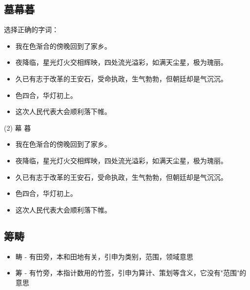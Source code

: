   \subsection{墓幕暮}

\begin{question}
选择正确的字词：

\begin{itemize}
  \item 我在\blank[width=0.5cm]{}色渐合的傍晚回到了家乡。
  \item 夜\blank[width=0.5cm]{}降临，星光灯火交相辉映，四处流光溢彩，如满天尘星，极为瑰丽。
  \item 久已有志于改革的王安石，受命执政，生气勃勃，但朝廷却是\blank[width=0.5cm]{}气沉沉。
  \item \blank*[width=0.5cm]{}色四合，华灯初上。
  \item 这次人民代表大会顺利落下帷\blank[width=0.5cm]{}。
\end{itemize}

 \begin{tasks}(2)
  \task 幕  \task 暮
 \end{tasks}

\end{question}
\begin{solution}
\begin{itemize}
  \item 我在色渐合的傍晚回到了家乡。
  \item 夜降临，星光灯火交相辉映，四处流光溢彩，如满天尘星，极为瑰丽。
  \item 久已有志于改革的王安石，受命执政，生气勃勃，但朝廷却是气沉沉。
  \item {}色四合，华灯初上。
  \item 这次人民代表大会顺利落下帷。
\end{itemize}
\end{solution}

   \subsection{筹畴}

\begin{itemize}
  \item 畴 - 有田旁，本和田地有关，引申为类别，范围，领域意思
  \item 筹 - 有竹旁，本指计数用的竹签，引申为算计、策划等含义，它没有"范围"的意思
\end{itemize}

